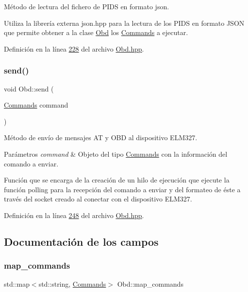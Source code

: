Método de lectura del fichero de P\+I\+DS en formato json. 

Utiliza la librería externa json.\+hpp para la lectura de los P\+I\+DS en formato J\+S\+ON que permite obtener a la clase \hyperlink{classObd}{Obd} los \hyperlink{classCommands}{Commands} a ejecutar. 

Definición en la línea \hyperlink{Obd_8hpp_source_l00228}{228} del archivo \hyperlink{Obd_8hpp_source}{Obd.\+hpp}.

\mbox{\label{classObd_a453591bc9a280e8d44d82025ce8590e9}} 
\subsubsection{\texorpdfstring{send()}{send()}}
{\footnotesize\ttfamily void Obd\+::send (\begin{DoxyParamCaption}\item[{\hyperlink{classCommands}{Commands}}]{command }\end{DoxyParamCaption})\hspace{0.3cm}{\ttfamily [inline]}}



Método de envío de mensajes AT y O\+BD al dispositivo E\+L\+M327. 


\begin{DoxyParams}{Parámetros}
{\em command} & Objeto del tipo \hyperlink{classCommands}{Commands} con la información del comando a enviar.\\
\hline
\end{DoxyParams}
Función que se encarga de la creación de un hilo de ejecución que ejecute la función polling para la recepción del comando a enviar y del formateo de éste a través del socket creado al conectar con el dispositivo E\+L\+M327. 

Definición en la línea \hyperlink{Obd_8hpp_source_l00248}{248} del archivo \hyperlink{Obd_8hpp_source}{Obd.\+hpp}.



\subsection{Documentación de los campos}
\mbox{\label{classObd_a8300062d1b651d049cf2a2bc916496cd}} 
\subsubsection{\texorpdfstring{map\+\_\+commands}{map\_commands}}
{\footnotesize\ttfamily std\+::map$<$std\+::string, \hyperlink{classCommands}{Commands}$>$ Obd\+::map\+\_\+commands}

